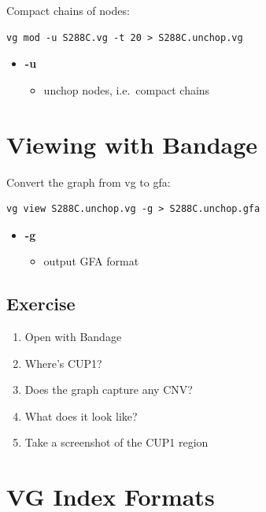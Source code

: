 \documentclass[
]{book}
\providecommand{\tightlist}{%
  \setlength{\itemsep}{0pt}\setlength{\parskip}{0pt}}
\begin{document}
Compact chains of nodes:

\begin{verbatim}
vg mod -u S288C.vg -t 20 > S288C.unchop.vg
\end{verbatim}

\begin{itemize}
\tightlist
\item
  \textbf{-u}

  \begin{itemize}
  \tightlist
  \item
    unchop nodes, i.e.~compact chains
  \end{itemize}
\end{itemize}

\hypertarget{viewing-with-bandage}{%
\section{Viewing with Bandage}\label{viewing-with-bandage}}

Convert the graph from vg to gfa:

\begin{verbatim}
vg view S288C.unchop.vg -g > S288C.unchop.gfa
\end{verbatim}

\begin{itemize}
\tightlist
\item
  \textbf{-g}

  \begin{itemize}
  \tightlist
  \item
    output GFA format
  \end{itemize}
\end{itemize}

\hypertarget{exercise}{%
\subsection{Exercise}\label{exercise}}

\begin{enumerate}
\def\labelenumi{\arabic{enumi}.}
\tightlist
\item
  Open with Bandage
\item
  Where's CUP1?
\item
  Does the graph capture any CNV?
\item
  What does it look like?
\item
  Take a screenshot of the CUP1 region
\end{enumerate}

\hypertarget{vg-index-formats}{%
\section{VG Index Formats}\label{vg-index-formats}}
\end{document}
